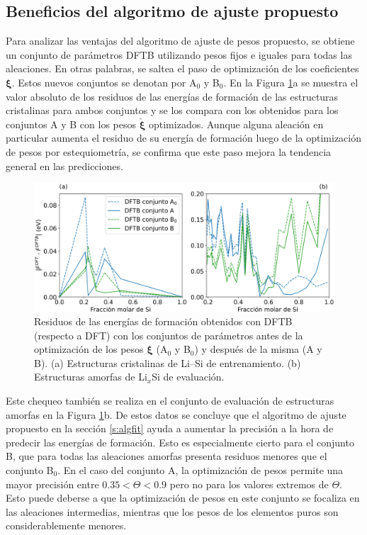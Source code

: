 \subsection{Beneficios del algoritmo de ajuste propuesto}

Para analizar las ventajas del algoritmo de ajuste de pesos propuesto, se
obtiene un conjunto de parámetros DFTB utilizando pesos fijos e iguales para
todas las aleaciones. En otras palabras, se saltea el paso de optimización de los
coeficientes $\boldsymbol{\xi}$. Estos nuevos conjuntos se denotan por A$_0$ y
B$_0$. En la Figura \ref{fig:residuos}a se muestra el valor absoluto de los
residuos de las energías de formación de las estructuras cristalinas para ambos
conjuntos y se los compara con los obtenidos para los conjuntos A y B con
los pesos $\check{\boldsymbol{\xi}}$ optimizados. Aunque alguna aleación en
particular aumenta el residuo de su energía de formación luego de la
optimización de pesos por estequiometría, se confirma que este paso mejora
la tendencia general en las predicciones.
\begin{figure}[h!]
	\centering
	\includegraphics[width=\textwidth]{Silicio/modelo/resultados/residuos/residuos.png}
	\caption{Residuos de las energías de formación obtenidos con DFTB (respecto a
	DFT) con los conjuntos de parámetros antes de la optimización de los pesos
    $\boldsymbol{\xi}$ (A$_0$ y B$_0$) y después de la misma (A y B). (a) Estructuras 
    cristalinas de Li--Si de entrenamiento. (b) Estructuras amorfas de Li$_x$Si de
    evaluación.}
	\label{fig:residuos}
\end{figure}

Este chequeo también se realiza en el conjunto de evaluación de estructuras
amorfas en la Figura \ref{fig:residuos}b. De estos datos se concluye que el
algoritmo de ajuste propuesto en la sección \ref{s:algfit} ayuda a aumentar
la precisión a la hora de predecir las energías de formación. Esto es
especialmente cierto para el conjunto B, que para todas las aleaciones amorfas
presenta residuos menores que el conjunto B$_0$. En el caso del conjunto A, 
la optimización de pesos permite una mayor precisión entre $0.35 < \Theta < 0.9$ 
pero no para los valores extremos de $\Theta$. Esto puede deberse a que la 
optimización de pesos en este conjunto se focaliza en las aleaciones intermedias, 
mientras que los pesos de los elementos puros son considerablemente menores.
